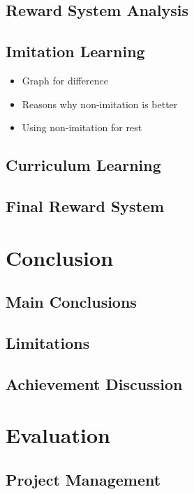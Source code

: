 \documentclass{article}
\begin{document}
\subsection{Reward System Analysis}
\lipsum[2][1]

\subsection{Imitation Learning}
\begin{itemize}
    \item Graph for difference
    \item Reasons why non-imitation is better
    \item Using non-imitation for rest
\end{itemize}

\subsection{Curriculum Learning}
\lipsum[2][1]

\subsection{Final Reward System}
\lipsum[2][1]

\section{Conclusion}
\lipsum[2][1]

\subsection{Main Conclusions}
\lipsum[2][1]

\subsection{Limitations}
\lipsum[2][1]

\subsection{Achievement Discussion}
\lipsum[2][1]

\section{Evaluation}

\subsection{Project Management}
\lipsum[2][1]
\end{document}
